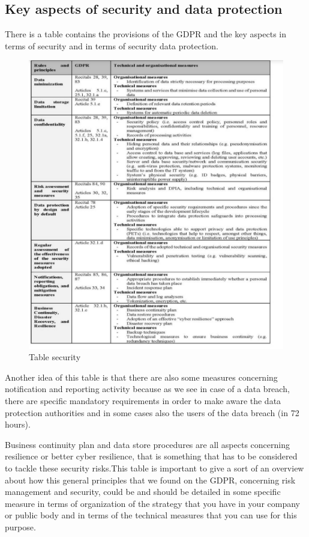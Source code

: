 \subsection{Key aspects of security and data protection}
There is a table contains the provisions of the GDPR and the key aspects in terms of security and in terms of security data protection.
\begin{figure}[!h]
    \centering
    \includegraphics[width=12cm]{Images/Table security.jpg}
    \caption{Table security}
    
\end{figure}
Another idea of this table is that there are also some measures concerning notification and reporting activity because as we see in case of a data breach, there are specific mandatory requirements in order to make aware the data protection authorities and in some cases also the users of the data breach (in 72 hours). 

Business continuity plan and data store procedures are all aspects concerning resilience or better cyber resilience, that is something that has to be considered to tackle these security risks.This table is important to give a sort of an overview about how this general principles that we found on the GDPR, concerning risk management and security, could be and should be detailed in some specific measure in terms of organization of the strategy that you have in your company or public body and in terms of the technical measures that you can use for this purpose.
